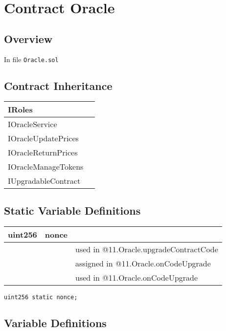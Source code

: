 
\chapter{Contract Oracle}

\minitoc

\section{Overview}


In file {\tt Oracle.sol}

\section{Contract Inheritance}


\noindent\begin{tabular}{|l|p{5cm}|}\hline
IRoles & \\\hline
IOracleService & \\\hline
IOracleUpdatePrices & \\\hline
IOracleReturnPrices & \\\hline
IOracleManageTokens & \\\hline
IUpgradableContract & \\\hline
\end{tabular}


\section{Static Variable Definitions}


\ifsoltables
\noindent\begin{tabular}{|l|l|p{5cm}|}\hline
uint256 & nonce &  \\\hline
 & & used in @11.Oracle.upgradeContractCode\\\hline
 & & assigned in @11.Oracle.onCodeUpgrade\\\hline
 & & used in @11.Oracle.onCodeUpgrade\\\hline
\end{tabular}
\fi


\begin{lstlisting}[firstnumber=22]
    uint256 static nonce;
\end{lstlisting}

\section{Variable Definitions}


